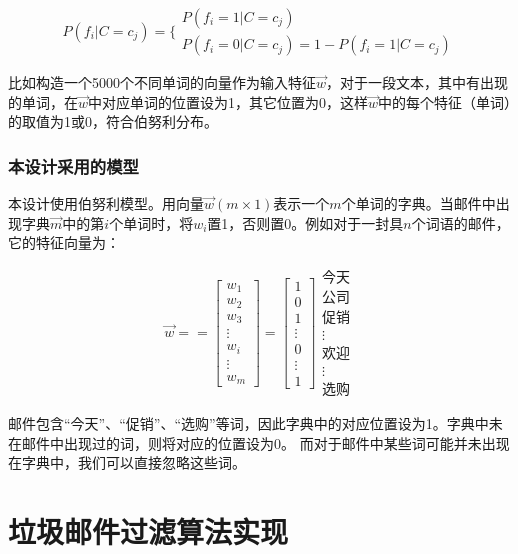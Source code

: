 \documentclass[UTF8,zihao=-4]{ctexart}
\begin{document}
	\begin{equation}
    P(f_i|C=c_j)=\{\begin{array}{l}{P(f_i=1|C=c_j)} \\ {P(f_i=0|C=c_j)=1-P(f_i=1|C=c_j)}\end{array}
	\end{equation}

    比如构造一个5000个不同单词的向量作为输入特征$\vec{w}$，对于一段文本，其中有出现的单词，在$\vec{w}$中对应单词的位置设为1，其它位置为0，这样$\vec{w}$中的每个特征（单词）的取值为1或0，符合伯努利分布。
\subsubsection{本设计采用的模型}
	本设计使用伯努利模型。用向量$\vec{w}(m \times 1)$表示一个$m$个单词的字典。当邮件中出现字典$\vec{m}$中的第$i$个单词时，将$w_i$置1，否则置0。例如对于一封具$n$个词语的邮件，它的特征向量为：
	
	$$
	\vec{w}=
	=
	\begin{bmatrix}
	w_1\\
	w_2\\
	w_3\\
	\vdots\\
	w_i\\
	\vdots\\
	w_m
	\end{bmatrix}
	=
	\begin{bmatrix}
	1\\
	0\\
	1\\
	\vdots\\
	0\\
	\vdots\\
	1
	\end{bmatrix}
	\begin{matrix}
	\text{今天}\\
	\text{公司}\\
	\text{促销}\\
	\vdots\\
	\text{欢迎}\\
	\vdots\\
	\text{选购}
	\end{matrix}
	$$
	
	邮件包含“今天”、“促销”、“选购”等词，因此字典中的对应位置设为1。字典中未在邮件中出现过的词，则将对应的位置设为0。 而对于邮件中某些词可能并未出现在字典中，我们可以直接忽略这些词。
	

\newpage
\section{垃圾邮件过滤算法实现}
\end{document}
